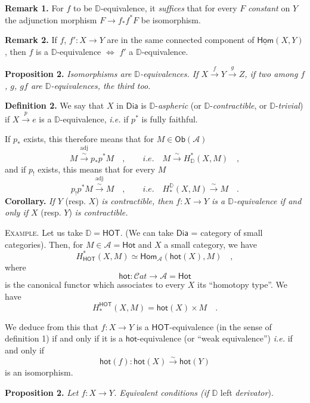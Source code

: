 \documentclass[11pt,leqno]{article}
\newcommand{\printedpage}[1]{\marginpar{\footnotesize p.~#1}}
\newcommand{\msp}[1]{\marginpar{\footnotesize [#1]}}
\newcommand{\DD}{\mathbb{D}}
\newcommand{\cA}{\mathcal{A}}
\newcommand{\Dia}{\mathsf{Dia}}
\newcommand{\Ob}{\mathsf{Ob}}
\newcommand{\hot}{\mathsf{hot}}
\newcommand{\Hot}{\mathsf{Hot}}
\newcommand{\HOT}{\mathsf{HOT}}
\newcommand{\isolongto}{\overset{\sim}{\longrightarrow}}
\newcommand{\sHom}{\mathsf{Hom}}
\newcommand{\uHom}{\underline{\mathsf{Hom}}}
\begin{document}
\noindent\textbf{Remark 1.} For $f$ to be $\DD$-equivalence, it \textit{suffices} that for every $F$ \textit{constant} on $Y$ the adjunction morphism $F \to f_*f^*F$ be isomorphism.

\noindent\textbf{Remark 2.} If $f$, $f' : X \to Y$ are in the same connected component of $\uHom(X, Y)$, then $f$ is a $\DD$-equivalence $\Leftrightarrow$ $f'$ a $\DD$-equivalence.

\noindent\textbf{Proposition 2.} \textit{Isomorphisms are $\DD$-equivalences. If $X \overset{f}{\to} Y \overset{g}{\to} Z$, if two among $f$, $g$, $gf$ are $\DD$-equivalences, the third too.} %

\noindent\textbf{Definition 2.} We say that $X$ in $\Dia$ is $\DD$-\textit{aspheric} (or $\DD$-\textit{contractible}, or $\DD$-\textit{trivial}) if $X \overset{p}{\to} e$ is a $\DD$-equivalence, \textit{i.e.} if $p^*$ is fully faithful.

If $p_*$ exists, this therefore means that for $M \in \Ob(\cA)$
\[
M \overset{\mathrm{adj}}{\isolongto} p_*p^*M \quad , \qquad \textit{i.e.} \quad M \isolongto H^*_{\DD}(X, M) \quad ,
\]
and if $p_!$ exists, this means that for every $M$
\[
p_!p^*M \overset{\mathrm{adj}}{\isolongto} M \quad , \qquad \textit{i.e.} \quad H^{\DD}_*(X, M) \isolongto M \quad .
\]
\textbf{Corollary.} \textit{If $Y$} (resp. $X$) \textit{is contractible, then $f : X \to Y$ is a $\DD$-equivalence if and only if $X$} (resp. $Y$) \textit{is contractible.}

\noindent\textsc{Example}. Let us take $\DD = \HOT$. (We can take $\Dia$ = category of small categories). Then, for $M \in \cA = \Hot$ and $X$ a small category, we have
\[
H^*_{\HOT}(X, M) \simeq \sHom_{\cA}(\hot(X), M) \quad ,
\]
where
\[
\hot : \mathcal{C}\mathit{at} \longrightarrow \cA = \Hot
\]
is the canonical functor which associates to every $X$ its ``homotopy type''. We have
\[
H^{\HOT}_*(X, M) = \hot(X) \times M \quad .
\]

\noindent\msp{page 63}

\noindent We deduce from this that $f : X \to Y$ is a $\HOT$-equivalence (in the sense of definition 1) if and only if it is a $\hot$-equivalence (or ``weak equivalence'') \textit{i.e.} if and only if
\[
\hot(f) : \hot(X) \isolongto \hot(Y)
\]
\printedpage{37}
is an isomorphism.

\noindent\textbf{Proposition 2.} \textit{Let $f : X \to Y$. Equivalent conditions (if $\DD$} left \textit{derivator}). %
\end{document}
